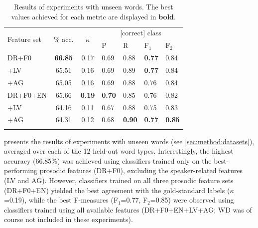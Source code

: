 \documentclass[a4paper]{article}
\begin{document}
		\begin{table}[p]
			\centering
			\caption[Results of experiments with unseen words]{Results of experiments with unseen words. %
			The best values achieved for each metric are displayed in \textbf{bold}.
			}
			\begin{tabularx}{\columnwidth}{lccXXXX}		
			\toprule
			\multirow{2}{*}{Feature set} & \multirow{2}{*}{\% acc.} & \multirow{2}{*}{$\kappa$} & \multicolumn{4}{c}{[correct] class} \\
			\cmidrule(lr){4-7}
			& & & P & R & F$_1$ & F$_2$ \\
			\midrule
DR+F0	&	\textbf{66.85}	&	0.17	&	0.69	&	0.88	&	\textbf{0.77}	&	0.84	\\
+LV %
	&	65.51	&	0.16	&	0.69	&	0.89	&	\textbf{0.77}	&	0.84	\\
+AG %
	&	65.05	&	0.16	&	0.69	&	0.88	&	0.76	&	0.84	\\
			\midrule								
DR+F0+EN	&	65.66	&	\textbf{0.19}	&	\textbf{0.70}	&	0.85	&	0.76	&	0.82	\\
+LV %
	&	64.16	&	0.11	&	0.67	&	0.88	&	0.75	&	0.83	\\
+AG %
	&	64.31	&	0.12	&	0.68	&	\textbf{0.90}	&	\textbf{0.77}	&	\textbf{0.85}	\\

		\bottomrule
			\label{tab:results:words}
			\end{tabularx}
		\end{table}	
		
		 presents the results of experiments with unseen words (see \cref{sec:method:datasets}), averaged over each of the 12 held-out word types.
		Interestingly, the highest accuracy (66.85\%) was achieved using classifiers trained only on the best-performing prosodic features (DR+F0), excluding the speaker-related features (LV and AG). However, classifiers trained on all three prosodic feature sets (DR+F0+EN) yielded the best agreement with the gold-standard labels ($\kappa$=0.19), while the best F-measures (F$_1$=0.77, F$_2$=0.85) were observed using classifiers trained using all available features (DR+F0+EN+LV+AG; WD was of course not included in these experiments).
		
\end{document}
